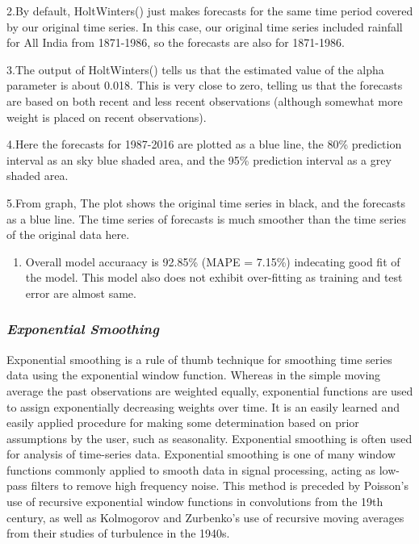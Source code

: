 \documentclass[12pt,openany]{book}
\providecommand{\tightlist}{%
  \setlength{\itemsep}{0pt}\setlength{\parskip}{0pt}}
\begin{document}
2.By default, HoltWinters() just makes forecasts for the same time period covered by our original time series. In this case, our original time series included rainfall for All India from 1871-1986, so the forecasts are also for 1871-1986.

3.The output of HoltWinters() tells us that the estimated value of the alpha parameter is about 0.018. This is very close to zero, telling us that the forecasts are based on both recent and less recent observations (although somewhat more weight is placed on recent observations).

4.Here the forecasts for 1987-2016 are plotted as a blue line, the 80\% prediction interval as an sky blue shaded area, and the 95\% prediction interval as a grey shaded area.

5.From graph, The plot shows the original time series in black, and the forecasts as a blue line. The time series of forecasts is much smoother than the time series of the original data here.

\begin{enumerate}
\def\labelenumi{\arabic{enumi}.}
\setcounter{enumi}{5}
\tightlist
\item
  Overall model accuraacy is 92.85\% (MAPE = 7.15\%) indecating good fit of the model. This model also does not exhibit over-fitting as training and test error are almost same.
\end{enumerate}

\hypertarget{exponential-smoothing}{%
\subsubsection{\texorpdfstring{\textbf{\textbf{\emph{Exponential Smoothing}}}}{Exponential Smoothing}}\label{exponential-smoothing}}

Exponential smoothing is a rule of thumb technique for smoothing time series data using the exponential window function. Whereas in the simple moving average the past observations are weighted equally, exponential functions are used to assign exponentially decreasing weights over time. It is an easily learned and easily applied procedure for making some determination based on prior assumptions by the user, such as seasonality. Exponential smoothing is often used for analysis of time-series data. Exponential smoothing is one of many window functions commonly applied to smooth data in signal processing, acting as low-pass filters to remove high frequency noise. This method is preceded by Poisson's use of recursive exponential window functions in convolutions from the 19th century, as well as Kolmogorov and Zurbenko's use of recursive moving averages from their studies of turbulence in the 1940s.
\end{document}
